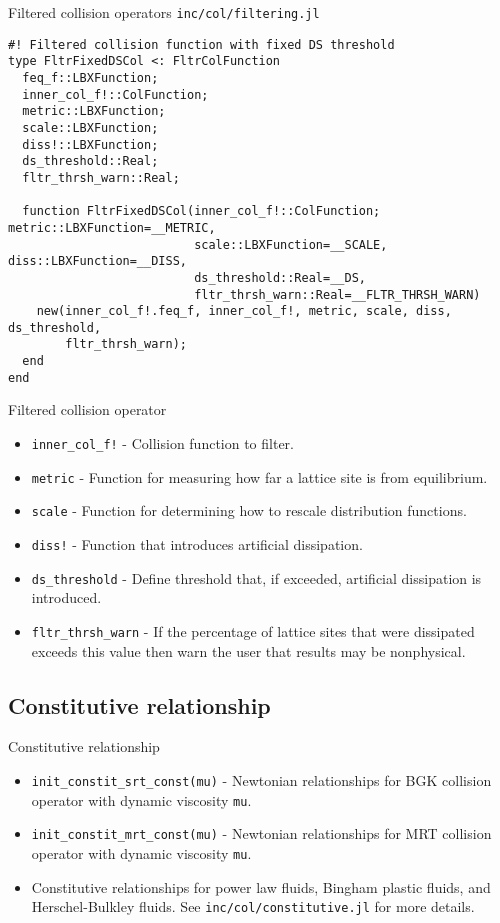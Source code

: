 \documentclass[pdf]{beamer}
\begin{document}
\begin{frame}[fragile]{Filtered collision operators}
  \texttt{inc/col/filtering.jl}
  \tiny
  \begin{lstlisting}
#! Filtered collision function with fixed DS threshold
type FltrFixedDSCol <: FltrColFunction
  feq_f::LBXFunction;
  inner_col_f!::ColFunction;
  metric::LBXFunction;
  scale::LBXFunction;
  diss!::LBXFunction;
  ds_threshold::Real;
  fltr_thrsh_warn::Real;

  function FltrFixedDSCol(inner_col_f!::ColFunction; metric::LBXFunction=__METRIC,
                          scale::LBXFunction=__SCALE, diss::LBXFunction=__DISS,
                          ds_threshold::Real=__DS, 
                          fltr_thrsh_warn::Real=__FLTR_THRSH_WARN)
    new(inner_col_f!.feq_f, inner_col_f!, metric, scale, diss, ds_threshold, 
        fltr_thrsh_warn);
  end
end
  \end{lstlisting}
\end{frame}

\begin{frame}{Filtered collision operator}
  \begin{itemize}
    \item \texttt{inner\_col\_f!} - Collision function to filter.
    \item \texttt{metric} - Function for measuring how far a lattice site is from equilibrium.
    \item \texttt{scale} - Function for determining how to rescale distribution functions.
    \item \texttt{diss!} - Function that introduces artificial dissipation.
    \item \texttt{ds\_threshold} - Define threshold that, if exceeded, artificial dissipation is introduced.
    \item \texttt{fltr\_thrsh\_warn} - If the percentage of lattice sites that were dissipated exceeds this value then warn the user that results may be nonphysical.
  \end{itemize}
\end{frame}

\subsection{Constitutive relationship}

\begin{frame}{Constitutive relationship}
  \begin{itemize}
    \item \texttt{init\_constit\_srt\_const(mu)} - Newtonian relationships for BGK collision operator with dynamic viscosity \texttt{mu}.
    \item \texttt{init\_constit\_mrt\_const(mu)} - Newtonian relationships for MRT collision operator with dynamic viscosity \texttt{mu}.
    \item Constitutive relationships for power law fluids, Bingham plastic fluids, and Herschel-Bulkley fluids. See \texttt{inc/col/constitutive.jl} for more details.
  \end{itemize}
\end{frame}
\end{document}
